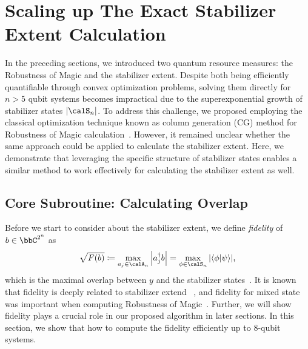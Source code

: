 \documentclass[a4paper, onecolumn, 11pt, longbibliography]{quantumarticle}
\newcommand{\defeq}{\coloneqq}
\begin{document}
\section{Scaling up The Exact Stabilizer Extent Calculation}

In the preceding sections, we introduced
two quantum resource measures:
the Robustness of Magic and the stabilizer extent.
Despite both being efficiently quantifiable through
convex optimization problems, solving them directly
for $n>5$ qubit systems becomes impractical
due to the superexponential growth
of stabilizer states $\abs{\calS_n}$.
To address this challenge,
we proposed employing the classical optimization
technique known as column generation (CG) method
for Robustness of Magic calculation~\cite{hamaguchiHandbookEfficientlyQuantifying2023}.
However, it remained unclear whether the same approach
could be applied to calculate the stabilizer extent.
Here, we demonstrate that leveraging the specific
structure of stabilizer states enables a similar
method to work effectively for calculating
the stabilizer extent as well.

\subsection{Core Subroutine: Calculating Overlap}
\label{sec:coreSubroutine}

Before we start to consider about
the stabilizer extent,
we define \textit{fidelity} of
$b \in \bbC^{2^n}$ as
\begin{equation*}
  \sqrt{F(b)} \defeq \max_{a_j \in \calA_n} \abs{a_j^\dagger b}
  = \max_{\phi \in \calS_n} \abs{\braket{\phi}{\psi}},
\end{equation*}
which is the maximal overlap between $y$ and
the stabilizer states~\cite[Definition 4]{Bravyi2019simulationofquantum}\cite{heimendahlStabilizerExtentNot2021}.
It is known that fidelity is deeply related to
stabilizer extend~\cite[Theorem 4]{Bravyi2019simulationofquantum}
\cite[Theorem 4]{heimendahlStabilizerExtentNot2021},
and fidelity for mixed state was important when computing
Robustness of Magic~\cite{hamaguchiHandbookEfficientlyQuantifying2023}.
Further, we will show fidelity plays a crucial role
in our proposed algorithm in later sections.
In this section, we show that how to compute
the fidelity efficiently up to 8-qubit systems.
\end{document}
